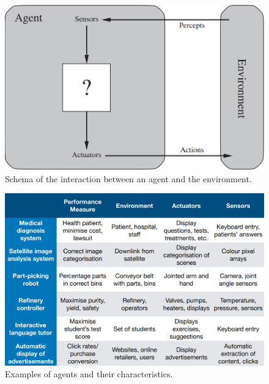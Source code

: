 \begin{figure}[hbt]
    \centering
    \includegraphics[scale=0.35]{Images/Chapter 1/agent-environment-schema.png}
    \caption{Schema of the interaction between an agent and the environment.}
    \label{fig:ch1-agentenvironmentschema}
\end{figure}
\begin{figure}[hbtp]
    \centering
    \includegraphics[width=\textwidth]{Images/Chapter 1/agents-type.png}
    \caption{Examples of agents and their characteristics.}
    \label{fig:ch1-agentexamples}
\end{figure}

